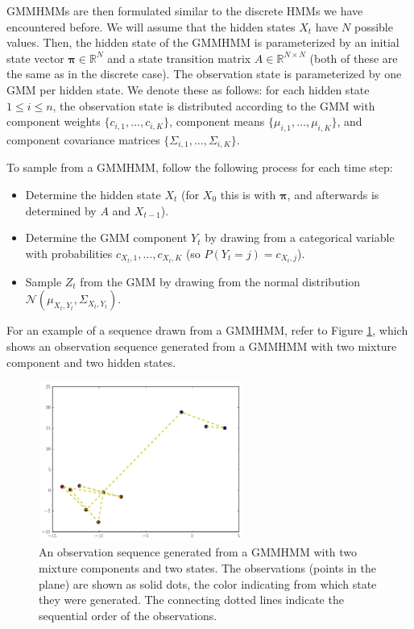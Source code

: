 GMMHMMs are then formulated similar to the discrete HMMs we have encountered before.
We will assume that the hidden states $X_t$ have $N$ possible values.
Then, the hidden state of the GMMHMM is parameterized by an initial state vector $\boldsymbol\pi \in \mathbb{R}^N$ and a state transition matrix $A\in \mathbb{R}^{N\times N}$ (both of these are the same as in the discrete case).
The observation state is parameterized by one GMM per hidden state. 
We denote these as follows: for each hidden state $1\leq i \leq n$, the observation state is distributed according to the GMM with component weights $\{c_{i,1},\ldots,c_{i,K}\}$, component means $\{\mu_{i,1},\ldots,\mu_{i,K}\}$, and component covariance matrices $\{\Sigma_{i,1},\ldots,\Sigma_{i,K}\}$.

To sample from a GMMHMM, follow the following process for each time step:
\begin{itemize}
\item Determine the hidden state $X_t$ (for $X_0$ this is with $\boldsymbol\pi$, and afterwards is determined by $A$ and $X_{t-1}$).
\item Determine the GMM component $Y_t$ by drawing from a categorical variable with probabilities $c_{X_t,1},\ldots,c_{X_t,K}$ (so $P(Y_t=j)=c_{X_t,j}$).
\item Sample $Z_t$ from the GMM by drawing from the normal distribution $\mathcal N(\mu_{X_t,Y_t}, \Sigma_{X_t,Y_t})$.
\end{itemize}
For an example of a sequence drawn from a GMMHMM, refer to Figure \ref{fig:samples}, which shows an observation sequence generated from a GMMHMM with two mixture component and two hidden states.

\begin{figure}
\centering
\includegraphics[width=0.6\textwidth]{figures/samples.pdf}
\caption{An observation sequence generated from a GMMHMM with two mixture components and two states.
The observations (points in the plane) are shown as solid dots, the color indicating from which
state they were generated. The connecting dotted lines indicate the sequential order of the observations.}
\label{fig:samples}
\end{figure}

